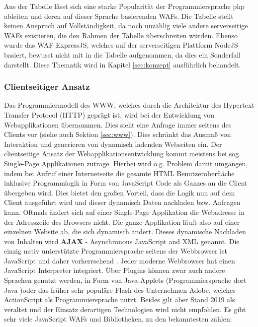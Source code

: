 Aus der Tabelle lässt sich eine starke Popularität der Programmiersprache php ableiten und deren auf dieser Sprache basierenden WAFs. Die Tabelle stellt keinen Anspruch auf Vollständigkeit, da noch unzählig viele andere serverseitige WAFs existieren, die den Rahmen der Tabelle überschreiten würden. Ebenso wurde das WAF ExpressJS, welches auf der serverseitigen Plattform NodeJS basiert, bewusst nicht mit in die Tabelle aufgenommen, da dies ein Sonderfall darstellt. Diese Thematik wird in Kapitel \ref{sec:konzept} ausführlich behandelt. 
\subsubsection{Clientseitiger Ansatz}\label{sec:clientseitigeransatz}
 Das Programmiermodell des WWW, welches durch die Architektur des Hypertext Transfer Protocol (HTTP) geprägt ist, wird bei der Entwicklung von Webapplikationen übernommen. Dies sieht eine Anfrage immer seitens des Clients vor (siehe auch Sektion \ref{sec:www}). Dies schränkt das Ausmaß von Interaktion und generieren von dynamisch ladenden Webseiten ein. 
 Der clientseitige Ansatz der Webapplikationsentwicklung kommt meistens bei sog. Single-Page Applikationen zutrage. Hierbei wird o.g. Problem damit umgangen, indem bei Aufruf einer Internetseite die gesamte HTML Benutzeroberfläche inklusive Programmlogik in Form von JavaScript Code als Ganzes an die Client übergeben wird. Dies bietet den großen Vorteil, dass die Logik nun auf dem Client ausgeführt wird und dieser dynamisch Daten nachladen bzw. Anfragen kann. Oftmals ändert sich auf einer Single-Page Applikation die Webadresse in der Adresszeile des Browsers nicht. Die ganze Applikation läuft also auf einer einzelnen Website ab, die sich dynamisch ändert. Dieses dynamische Nachladen von Inhalten wird \textbf{AJAX} - Asynchronous JavaScript and XML genannt.  Die einzig nativ unterstützte Programmiersprache seitens der Webbrowser ist JavaScript und daher vorherrschend \cite{safran2011webtechnologien:article}.
 Jeder moderne Webbrowser hat einen JavaScript Interpreter integriert. Über Plugins können zwar auch andere Sprachen genutzt werden, in Form von Java-Applets (Programmiersprache dort Java )oder das früher sehr populäre Flash des Unternehmen Adobe, welches ActionScript als Programmiersprache nutzt. Beides gilt aber Stand 2019 als veraltet und der Einsatz derartigen Technologien wird nicht empfohlen. %
Es gibt sehr viele JavaScript WAFs und Bibliotheken, zu den bekanntesten zählen: \\ \\ 
